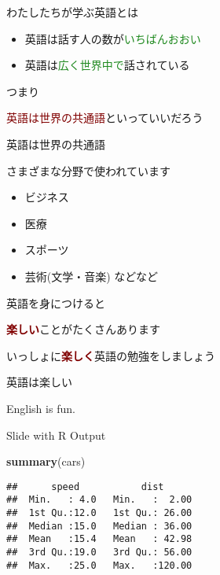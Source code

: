 \documentclass[
  ignorenonframetext,
  aspectratio=169,
  xcolor=dvipsnames]{beamer}
\newenvironment{Shaded}{\begin{snugshade}}{\end{snugshade}}
\newcommand{\FunctionTok}[1]{\textcolor[rgb]{0.13,0.29,0.53}{\textbf{#1}}}
\newcommand{\NormalTok}[1]{#1}
\providecommand{\tightlist}{%
  \setlength{\itemsep}{0pt}\setlength{\parskip}{0pt}}
\let\oldShaded\Shaded
\let\endoldShaded\endShaded
\renewenvironment{Shaded}{\footnotesize\oldShaded}{\endoldShaded}
\begin{document}
\begin{frame}{わたしたちが学ぶ英語とは}
\label{ux308fux305fux3057ux305fux3061ux304cux5b66ux3076ux82f1ux8a9eux3068ux306f}
\Large

\begin{itemize}[<+->]
\tightlist
\item
  英語は話す人の数が\textcolor{ForestGreen}{いちばんおおい}
\item
  英語は\textcolor{ForestGreen}{広く世界中で}話されている
\end{itemize}

つまり\pause

\textcolor{Maroon}{英語は世界の共通語}といっていいだろう
\end{frame}

\begin{frame}{英語は世界の共通語}
\label{ux82f1ux8a9eux306fux4e16ux754cux306eux5171ux901aux8a9e}
\Large

さまざまな分野で使われています

\begin{itemize}[<+->]
\tightlist
\item
  ビジネス
\item
  医療
\item
  スポーツ
\item
  芸術(文学・音楽) などなど
\end{itemize}
\end{frame}

\begin{frame}{英語を身につけると}
\label{ux82f1ux8a9eux3092ux8eabux306bux3064ux3051ux308bux3068}
\Large

\textcolor{Maroon}{\bfseries 楽しい}ことがたくさんあります\pause

いっしょに\textcolor{Maroon}{\bfseries 楽しく}英語の勉強をしましょう
\end{frame}

\begin{frame}{英語は楽しい}
\label{ux82f1ux8a9eux306fux697dux3057ux3044}
\Huge

\centering

English is fun.
\end{frame}

\begin{frame}{}
\label{section-4}
\end{frame}

\begin{frame}[fragile]{Slide with R Output}
\label{slide-with-r-output}
\begin{Shaded}
\begin{Highlighting}[]
\FunctionTok{summary}\NormalTok{(cars)}
\end{Highlighting}
\end{Shaded}

\begin{verbatim}
##      speed           dist       
##  Min.   : 4.0   Min.   :  2.00  
##  1st Qu.:12.0   1st Qu.: 26.00  
##  Median :15.0   Median : 36.00  
##  Mean   :15.4   Mean   : 42.98  
##  3rd Qu.:19.0   3rd Qu.: 56.00  
##  Max.   :25.0   Max.   :120.00
\end{verbatim}
\end{frame}
\end{document}

